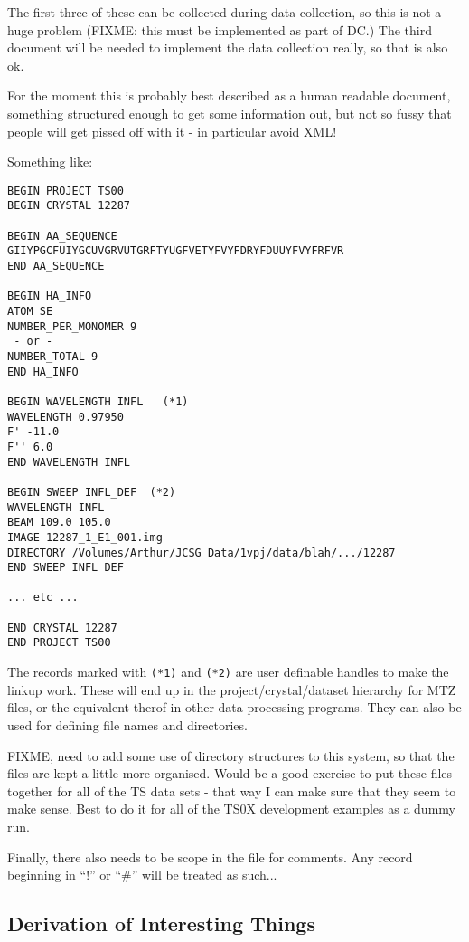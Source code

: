 \documentclass[a4paper, 11pt]{article}
\begin{document}
\noindent
The first three of these can be collected during data collection, so this is
not a huge problem (FIXME: this must be implemented as part of DC.) The
third document will be needed to implement the data collection really, so
that is also ok.

For the moment this is probably best described as a human readable document,
something structured enough to get some information out, but not so fussy
that people will get pissed off with it - in particular avoid XML!

Something like:

\begin{verbatim}
BEGIN PROJECT TS00
BEGIN CRYSTAL 12287

BEGIN AA_SEQUENCE
GIIYPGCFUIYGCUVGRVUTGRFTYUGFVETYFVYFDRYFDUUYFVYFRFVR
END AA_SEQUENCE

BEGIN HA_INFO
ATOM SE
NUMBER_PER_MONOMER 9
 - or -
NUMBER_TOTAL 9
END HA_INFO

BEGIN WAVELENGTH INFL   (*1)
WAVELENGTH 0.97950
F' -11.0
F'' 6.0
END WAVELENGTH INFL

BEGIN SWEEP INFL_DEF  (*2)
WAVELENGTH INFL
BEAM 109.0 105.0
IMAGE 12287_1_E1_001.img
DIRECTORY /Volumes/Arthur/JCSG Data/1vpj/data/blah/.../12287
END SWEEP INFL DEF

... etc ...

END CRYSTAL 12287
END PROJECT TS00
\end{verbatim}

\noindent
The records marked with \verb|(*1)| and \verb|(*2)| are user definable handles
to make the linkup work. These will end up in the project/crystal/dataset
hierarchy for MTZ files, or the equivalent therof in other data processing
programs. They can also be used for defining file names and directories.

FIXME, need to add some use of directory structures to this system,
so that the files are kept a little more organised. Would be a good 
exercise to put these files together for all of the TS data sets -
that way I can make sure that they seem to make sense. Best to do it 
for all of the TS0X development examples as a dummy run.

Finally, there also needs to be scope in the file for comments. Any record
beginning in ``!'' or ``\#'' will be treated as such...

\subsection{Derivation of Interesting Things}
\end{document}

